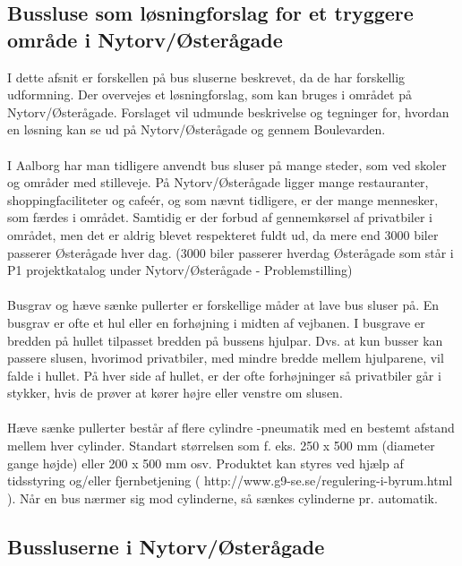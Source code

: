 \subsection{Bussluse som løsningforslag for et tryggere område i Nytorv/Østerågade}
\label{bussluselosningforslag}

I dette afsnit er forskellen på bus sluserne beskrevet, da de har forskellig udformning. Der overvejes et løsningforslag, som kan bruges i området på Nytorv/Østerågade. Forslaget vil udmunde beskrivelse og tegninger for, hvordan en løsning kan se ud på Nytorv/Østerågade og gennem Boulevarden.      
\\\\
I Aalborg har man tidligere anvendt bus sluser på mange steder, som ved skoler og områder med stilleveje. På Nytorv/Østerågade ligger mange restauranter, shoppingfaciliteter og cafeér, og som nævnt tidligere, er der mange mennesker, som færdes i området. Samtidig er der forbud af gennemkørsel af privatbiler i området, men det er aldrig blevet respekteret fuldt ud, da mere end 3000 biler passerer Østerågade hver dag. (3000 biler passerer hverdag Østerågade som står i P1 projektkatalog under Nytorv/Østerågade - Problemstilling)
\\\\
Busgrav og hæve sænke pullerter er forskellige måder at lave bus sluser på.
En busgrav er ofte et hul eller en forhøjning i midten af vejbanen. I busgrave er bredden på hullet tilpasset bredden på bussens hjulpar. Dvs. at kun busser kan passere slusen, hvorimod privatbiler, med mindre bredde mellem hjulparene, vil falde i hullet. På hver side af hullet, er der ofte forhøjninger så privatbiler går i stykker, hvis de prøver at kører højre eller venstre om slusen. 
\\\\
Hæve sænke pullerter består af flere cylindre -pneumatik med en bestemt afstand mellem hver cylinder. Standart størrelsen som f. eks. 250 x 500 mm (diameter gange højde) eller 200 x 500 mm osv. Produktet kan styres ved hjælp af tidsstyring og/eller fjernbetjening ( http://www.g9-se.se/regulering-i-byrum.html ). Når en bus nærmer sig mod cylinderne, så sænkes cylinderne pr. automatik. 


        


\subsection{Bussluserne i Nytorv/Østerågade}
\label{bussluseinytorv}                                           
                                           
